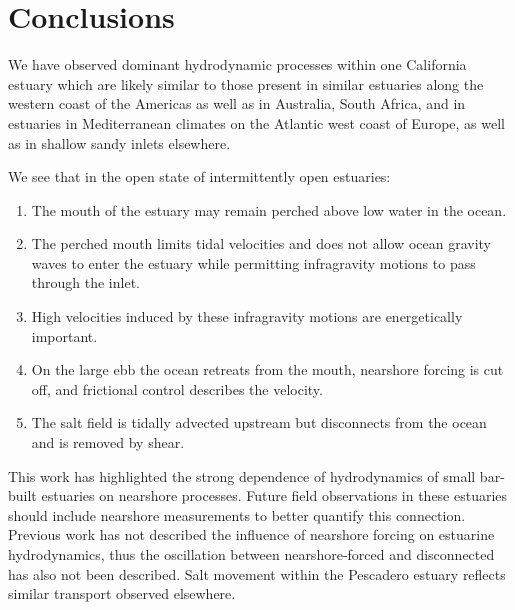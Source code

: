 

\section{Conclusions}

We have observed dominant hydrodynamic processes within one California
estuary which are likely similar to those present in similar estuaries
along the western coast of the Americas as well as in Australia, South
Africa, and in estuaries in Mediterranean climates on the Atlantic
west coast of Europe, as well as in shallow sandy inlets elsewhere.

We see that in the open state of intermittently open estuaries:
\begin{enumerate}
\item The mouth of the estuary may remain perched above low water in the
ocean.
\item The perched mouth limits tidal velocities and does not allow ocean
gravity waves to enter the estuary while permitting infragravity motions
to pass through the inlet.
\item High velocities induced by these infragravity motions are energetically
important.
\item On the large ebb the ocean retreats from the mouth, nearshore forcing
is cut off, and frictional control describes the velocity.
\item The salt field is tidally advected upstream but disconnects from the
ocean and is removed by shear.
\end{enumerate}
This work has highlighted the strong dependence of hydrodynamics of
small bar-built estuaries on nearshore processes. Future field observations
in these estuaries should include nearshore measurements to better
quantify this connection. Previous work has not described the influence of nearshore forcing on estuarine hydrodynamics, thus the oscillation between nearshore-forced and disconnected has also not been described. Salt movement within the Pescadero estuary reflects similar transport observed elsewhere. 







